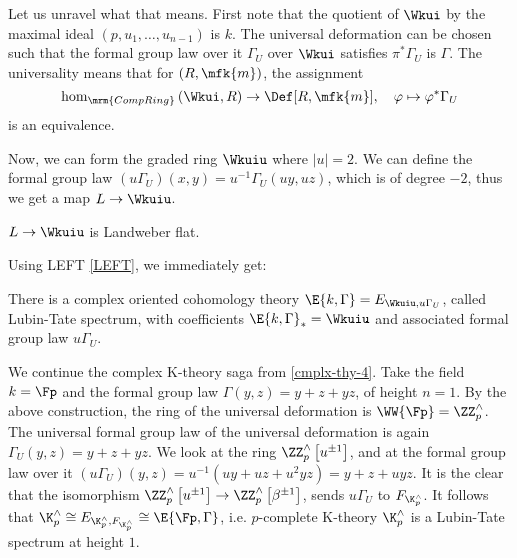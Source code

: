 Let us unravel what that means.
First note that the quotient of $\Wkui$ by the maximal ideal $\left(p, u_1, \dotsc, u_{n-1}\right)$ is $k$.
The universal deformation can be chosen such that the formal group law over it $\Gamma_U$ over $\Wkui$ satisfies $\pi^* \Gamma_U$ is $\Gamma$.
The universality means that for $\left(R, \mfk{m}\right)$, the assignment
$$
\hom_{\mrm{CompRing}}\left(\Wkui, R\right) \to \Def[R, \mfk{m}], \quad
\varphi \mapsto \varphi^* \Gamma_U
$$
is an equivalence.


Now, we can form the graded ring $\Wkuiu$ where $\left|u\right| = 2$.
We can define the formal group law $\left(u \Gamma_U\right) \left(x, y\right) = u^{-1} \Gamma_U \left(u y, u z\right)$, which is of degree $-2$, thus we get a map $L \to \Wkuiu$.

\begin{proposition}
	$L \to \Wkuiu$ is Landweber flat.
\end{proposition}

Using LEFT \ref{LEFT}, we immediately get:

\begin{corollary}
	There is a complex oriented cohomology theory $\E{k, \Gamma} = E_{\Wkuiu, u \Gamma_U}$, called Lubin-Tate spectrum, with coefficients $\E{k, \Gamma}_* = \Wkuiu$ and associated formal group law $u \Gamma_U$.
\end{corollary}

\begin{example}\label{cmplx-thy-5}
	We continue the complex K-theory saga from \ref{cmplx-thy-4}.
	Take the field $k = \Fp$ and the formal group law $\Gamma\left(y, z\right) = y + z + y z$, of height $n = 1$.
	By the above construction, the ring of the universal deformation is $\WW{\Fp} = \ZZ_p^\wedge$.
	The universal formal group law of the universal deformation is again $\Gamma_U \left(y, z\right) = y + z + y z$.
	We look at the ring $\ZZ_p^\wedge\left[u^{\pm1}\right]$, and at the formal group law over it
	$
	\left(u\Gamma_U\right) \left(y, z\right)
	= u^{-1} \left(u y + u z + u^2 y z\right)
	= y + z + u y z
	$.
	It is the clear that the isomorphism $\ZZ_p^\wedge\left[u^{\pm1}\right] \to \ZZ_p^\wedge\left[\beta^{\pm1}\right]$, sends $u\Gamma_U$ to $F_{\K_p^\wedge}$.
	It follows that
	$
	\K_p^\wedge
	\cong E_{\K_p^\wedge, F_{\K_p^\wedge}}
	\cong \E{\Fp, \Gamma}
	$,
	i.e. $p$-complete K-theory $\K_p^\wedge$ is a Lubin-Tate spectrum at height $1$.
\end{example}

